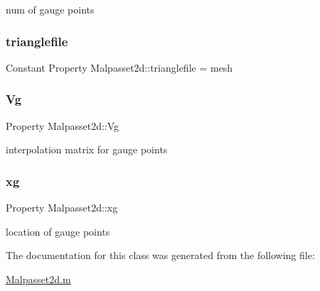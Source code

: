 num of gauge points 

\mbox{\label{class_malpasset2d_ab40fe7dd88f25236ff730490538f71ae}} 
\subsubsection{\texorpdfstring{trianglefile}{trianglefile}}
{\footnotesize\ttfamily Constant Property Malpasset2d\+::trianglefile = \textquotesingle{}mesh}

\mbox{\label{class_malpasset2d_ac1845caf0b00020cd61a3f7c360dbbee}} 
\subsubsection{\texorpdfstring{Vg}{Vg}}
{\footnotesize\ttfamily Property Malpasset2d\+::\+Vg}



interpolation matrix for gauge points 

\mbox{\label{class_malpasset2d_a4bf273e150a63609562afee5ff0f37e2}} 
\subsubsection{\texorpdfstring{xg}{xg}}
{\footnotesize\ttfamily Property Malpasset2d\+::xg}



location of gauge points 



The documentation for this class was generated from the following file\+:\begin{DoxyCompactItemize}
\item 
\hyperlink{_malpasset2d_8m}{Malpasset2d.\+m}\end{DoxyCompactItemize}
